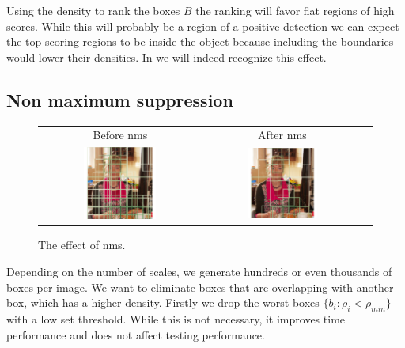 Using the density to rank the boxes $B$ the ranking will favor flat regions of high scores. While this will probably be a region of a positive detection we can expect the top scoring regions to be inside the object because including the boundaries would lower their densities. In  we will indeed recognize this effect.

\clearpage
\subsection{Non maximum suppression}
\label{sec:pipeline:eval:nms}
\begin{figure}[htb]
    \begin{tabular}{ccc}
        Before \gls{nms} & After \gls{nms} \\[3pt]
        \includegraphics[width=0.47\textwidth]{figures/nms_before} &
        \includegraphics[width=0.47\textwidth]{figures/nms_after}
    \end{tabular}
	\caption{The effect of \acrfull{nms}.}
    \label{fig:nms}
\end{figure}
Depending on the number of scales, we generate hundreds or even thousands of boxes per image. We want to eliminate boxes that are overlapping with another box, which has a higher density. Firstly we drop the worst boxes $\{b_i: \rho_i < \rho_{min}\}$ with a low set threshold. While this is not necessary, it improves time performance and does not affect testing performance.\\
